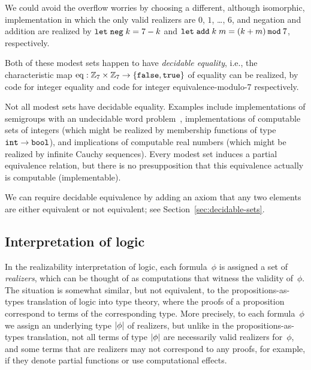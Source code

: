 We could avoid the overflow worries by choosing a different, although
isomorphic, implementation in which the only valid realizers are $0$,
$1$, \ldots, $6$, and negation and addition are realized by
$\mathtt{let}\;\mathtt{neg}\; k = 7 - k$ and $\mathtt{let}\;\mathtt{add}\; k\; m = (k +
  m) \mathbin{\mathtt{mod}} 7$, respectively.
\fi

Both of these modest sets happen to have \emph{decidable equality},
i.e., the characteristic map $\mathrm{eq} : \mathbb{Z}_7 \times
\mathbb{Z}_7 \to \{\mathtt{false}, \mathtt{true}\}$ of equality can be 
realized, by code for integer equality and code for integer equivalence-modulo-7
respectively.

Not all modest sets have decidable
equality.  Examples include implementations of semigroups with an undecidable word
problem~\cite{post47:_recur_unsol_probl_thue}, implementations of computable sets of integers (which might be realized by
membership functions of type $\mathtt{int}\to\mathtt{bool}$), and implications of computable real numbers (which might be realized
by infinite Cauchy sequences).  Every modest set induces a partial equivalence relation, but there is no
presupposition that this equivalence actually is computable (implementable).

We can require decidable equivalence
by adding an axiom that any two elements are either equivalent
or not equivalent; see Section~\ref{sec:decidable-sets}.


\subsection{Interpretation of logic}
\label{sec:interpretation-logic}

In the realizability interpretation of logic, each formula~$\phi$ is
assigned a set of \emph{realizers}, which can be thought of as
computations that witness the validity of~$\phi$. The situation is
somewhat similar, but not equivalent, to the propositions-as-types
translation of logic into type theory, where the proofs of a
proposition correspond to terms of the corresponding type. More
precisely, to each formula~$\phi$ we assign an underlying type
$|\phi|$ of realizers, but unlike in the propositions-as-types
translation, not all terms of type $|\phi|$ are necessarily
valid realizers for~$\phi$, and some terms that are realizers may not
correspond to any proofs, for example, if they denote partial
functions or use computational effects.

